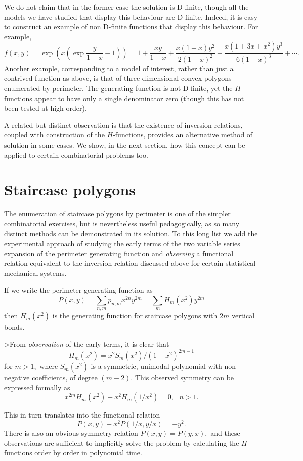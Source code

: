 We do not claim that in the former case the solution is D-finite,
though all the models we have studied that display this
behaviour are D-finite. Indeed, it is easy to construct an example
of non D-finite functions that display this behaviour.
For example,
\begin{equation}
f(x,y) = \exp(x(\exp{\frac{y}{1-x}} - 1)) = 1 + \frac{xy}{1-x} +
\frac{x(1+x)y^2}{2(1-x)^2} + \frac{x(1+3x+x^2)y^3}{6(1-x)^3} + \cdots .
\end{equation}
Another example, corresponding to a model of interest, rather than
just a contrived function as above, is that of
three-dimensional convex polygons \cite{BG96a,BG96b} enumerated
by perimeter. The generating function is not D-finite, yet the
$H$-functions appear to have only a single denominator zero
(though this has not been tested at high order).


A related but
distinct observation is that the existence of 
inversion relations, coupled with construction of the $H$-functions,
provides an alternative method of
solution in some cases. We show, in the next section,
how this concept can be applied
to certain combinatorial problems too.

\section{Staircase polygons}
The enumeration of staircase polygons by perimeter is one of the
simpler combinatorial exercises, but is nevertheless useful
pedagogically, as so many distinct methods can be
demonstrated in its solution. To this long list we
add the experimental approach of studying the early
terms of the two variable series expansion of the
perimeter generating function and {\em observing} a
functional relation equivalent to the inversion relation
discussed above for certain statistical mechanical systems.

If we write the perimeter generating function as
$$P(x,y) = \sum_{n,m} p_{n,m} x^{2n}y^{2m} = \sum_m H_m(x^2)y^{2m} $$
then $H_m(x^2)$ is the generating function for 
staircase polygons with $2m$ vertical bonds.

>From {\em observation} of the early terms, it is
clear that $$H_m(x^2) = x^2S_m(x^2)/(1-x^2)^{2m-1}$$ for
$m > 1,$ where $S_m(x^2)$ is a symmetric, unimodal polynomial
with non-negative coefficients, of degree $(m-2).$ This
observed  symmetry can be expressed formally as
$$x^{2m}H_m(x^2) + x^2H_m(1/x^2) = 0, \mbox{  } n > 1.$$

This  in turn translates into the functional relation
$$P(x,y) + x^2P(1/x,y/x) = -y^2.$$
There is also an obvious symmetry relation $P(x,y)=P(y,x),$
and these observations are sufficient to implicitly
solve the problem by calculating the $H$ functions order
by order in polynomial time.

